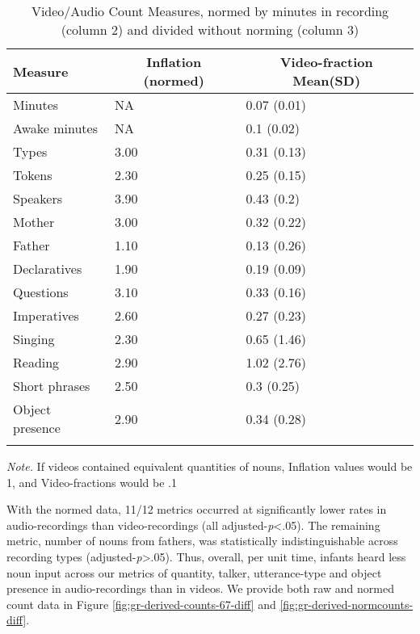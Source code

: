 \documentclass[floatsintext,man]{apa6}
\theoremstyle{definition}
\theoremstyle{definition}
\theoremstyle{definition}
\theoremstyle{remark}
\begin{document}
\begin{table}[tbp]
\begin{center}
\begin{threeparttable}
\caption{\label{tab:normtable}Video/Audio Count Measures, normed by minutes in recording (column 2) and divided without norming (column 3)}
\small{
\begin{tabular}{lll}
\toprule
Measure & \multicolumn{1}{c}{Inflation (normed)} & \multicolumn{1}{c}{Video-fraction Mean(SD)}\\
\midrule
Minutes & NA & 0.07 (0.01)\\
Awake minutes & NA & 0.1 (0.02)\\
Types & 3.00 & 0.31 (0.13)\\
Tokens & 2.30 & 0.25 (0.15)\\
Speakers & 3.90 & 0.43 (0.2)\\
Mother & 3.00 & 0.32 (0.22)\\
Father & 1.10 & 0.13 (0.26)\\
Declaratives & 1.90 & 0.19 (0.09)\\
Questions & 3.10 & 0.33 (0.16)\\
Imperatives & 2.60 & 0.27 (0.23)\\
Singing & 2.30 & 0.65 (1.46)\\
Reading & 2.90 & 1.02 (2.76)\\
Short phrases & 2.50 & 0.3 (0.25)\\
Object presence & 2.90 & 0.34 (0.28)\\
\bottomrule
\addlinespace
\end{tabular}
}
\begin{tablenotes}[para]
\textit{Note.} If videos contained equivalent quantities of nouns, Inflation values would be 1, and Video-fractions would be .1
\end{tablenotes}
\end{threeparttable}
\end{center}
\end{table}

With the normed data, 11/12 metrics occurred at significantly lower
rates in audio-recordings than video-recordings (all
adjusted-\emph{p}\textless{}.05). The remaining metric, number of nouns
from fathers, was statistically indistinguishable across recording types
(adjusted-\emph{p}\textgreater{}.05). Thus, overall, per unit time,
infants heard less noun input across our metrics of quantity, talker,
utterance-type and object presence in audio-recordings than in videos.
We provide both raw and normed count data in Figure
\ref{fig:gr-derived-counts-67-diff} and
\ref{fig:gr-derived-normcounts-diff}.
\end{document}
